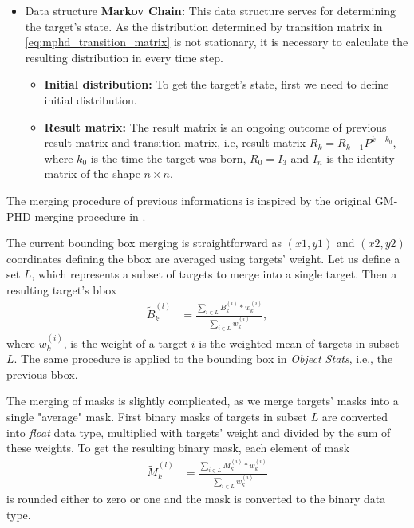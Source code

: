 \begin{itemize}
\begin{itemize}
      \end{itemize}
  \item Data structure \textbf{Markov Chain:} This data structure serves for determining the target's state. As the
  distribution determined by transition matrix in \eqref{eq:mphd_transition_matrix} is not stationary, it is necessary
  to calculate the resulting distribution in every time step.
      \begin{itemize}
        \item \textbf{Initial distribution:} To get the target's state, first we need to define initial distribution.
        \item \textbf{Result matrix:} The result matrix is an ongoing outcome of previous result matrix and transition
        matrix, i.e, result matrix $R_k = R_{k-1} P^{k-k_0}$, where $k_0$ is the time the target was born,
        $R_0 = I_3$ and $I_n$ is the identity matrix of the shape $n\times n$.
      \end{itemize}
\end{itemize}

The merging procedure of previous informations is inspired by the original GM-PHD merging procedure in \cite{
  VoMaPHD2006}.

The current bounding box merging is straightforward as $(x1,y1)$ and $(x2,y2)$ coordinates defining the bbox are
averaged using targets' weight. Let us define a set $L$, which represents a subset of targets to merge into a single
target. Then a resulting target's bbox
\begin{align}
  \tilde{B}_k^{(l)} &= \frac{\sum_{i \in L} B_k^{(i)} * w_k^{(i)}}{\sum_{i \in L}{w_k^{(i)}}},
\end{align}
where $w_k^{(i)}$, is the weight of a target $i$ is the weighted mean of targets in subset $L$. The same procedure is
applied to the bounding box in \textit{Object Stats}, i.e., the previous bbox.

The merging of masks is slightly complicated, as we merge targets' masks into a single "average" mask. First binary 
masks of targets in subset $L$ are converted into \textit{float} data type, multiplied with targets' weight and 
divided by the sum of these weights. To get the resulting binary mask, each element of mask
\begin{align}
  \tilde{M}_k^{(l)} &= \frac{\sum_{i \in L} M_k^{(i)} * w_k^{(i)}}{\sum_{i \in L}{w_k^{(i)}}}
\end{align}
is rounded either to zero or one and the mask is converted to the binary data type.

